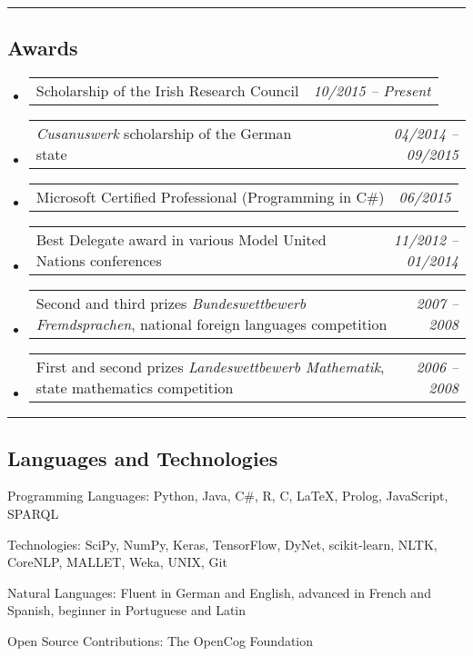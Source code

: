 \documentclass[10pt,letterpaper]{article}
\makeatletter
\newenvironment{indentsection}[1]%
{\begin{list}{}%
	{\setlength{\leftmargin}{#1}}%
	\item[]%
}
{\end{list}}
\newcommand{\headerrow}[2]
{\begin{tabular*}{\linewidth}{l@{\extracolsep{\fill}}r}
	#1 &
	#2 \\
\end{tabular*}}
\makeatother
\begin{document}
\hrule
\vspace{-0.4em}
\subsection*{Awards}

\begin{itemize}
	\parskip=0.1em
	
	\item 
	\headerrow
		{Scholarship of the Irish Research Council}
		{\emph{10/2015 -- Present}}
	\item 
	\headerrow
		{\emph{Cusanuswerk} scholarship of the German state}
		{\emph{04/2014 -- 09/2015}}	
	\item 
	\headerrow
		{Microsoft Certified Professional (Programming in C\#)}
		{\emph{06/2015}}
	\item 
	\headerrow
		{Best Delegate award in various Model United Nations conferences}
		{\emph{11/2012 -- 01/2014}}
	\item 
	\headerrow
		{Second and third prizes \emph{Bundeswettbewerb Fremdsprachen}, national foreign languages competition}
		{\emph{2007 -- 2008}}
	\item 
	\headerrow
		{First and second prizes \emph{Landeswettbewerb Mathematik}, state mathematics competition}
		{\emph{2006 -- 2008}}
	

\end{itemize}

\hrule
\vspace{-0.4em}
\subsection*{Languages and Technologies}

\begin{indentsection}{\parindent}
\begin{description*}
	\item[Programming Languages:]
	Python, Java, C\#, R, C, \LaTeX, Prolog, JavaScript, SPARQL
	\item[Technologies:]
	SciPy, NumPy, Keras, TensorFlow, DyNet, scikit-learn, NLTK, CoreNLP, MALLET, Weka, UNIX, Git
	\item[Natural Languages:]
	Fluent in German and English, advanced in French and Spanish, beginner in Portuguese and Latin	
	\item[Open Source Contributions:]
	The OpenCog Foundation
\end{description*}
\end{indentsection}
\end{document}
